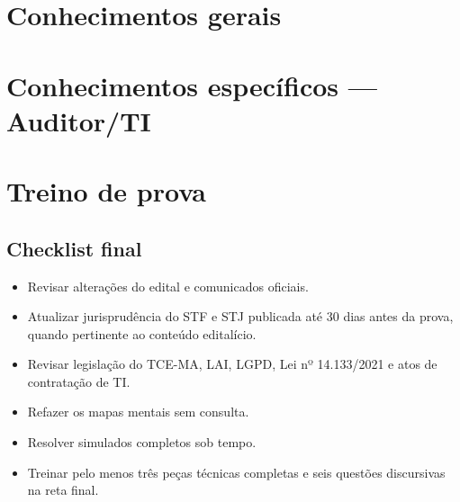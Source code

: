 \documentclass[11pt,oneside,openany]{book}
\begin{document}
\tableofcontents

\mainmatter

\part{Conhecimentos gerais}










\part{Conhecimentos específicos — Auditor/TI}











\part{Treino de prova}



\backmatter
\chapter*{Checklist final}
\begin{itemize}
\item Revisar alterações do edital e comunicados oficiais.
\item Atualizar jurisprudência do STF e STJ publicada até 30 dias antes da prova, quando pertinente ao conteúdo editalício.
\item Revisar legislação do TCE-MA, LAI, LGPD, Lei nº 14.133/2021 e atos de contratação de TI.
\item Refazer os mapas mentais sem consulta.
\item Resolver simulados completos sob tempo.
\item Treinar pelo menos três peças técnicas completas e seis questões discursivas na reta final.
\end{itemize}
\end{document}
